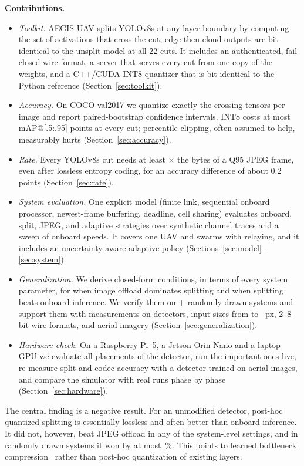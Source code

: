 \documentclass[journal,twocolumn,10pt]{IEEEtran}
\begin{document}
\textbf{Contributions.}
\begin{itemize}
\item \emph{Toolkit.} AEGIS-UAV splits YOLOv8s at any layer boundary by computing the set of activations that cross the cut; edge-then-cloud outputs are bit-identical to the unsplit model at all 22 cuts. It includes an authenticated, fail-closed wire format, a server that serves every cut from one copy of the weights, and a C++/CUDA INT8 quantizer that is bit-identical to the Python reference (Section~\ref{sec:toolkit}).
\item \emph{Accuracy.} On COCO val2017 we quantize exactly the crossing tensors per image and report paired-bootstrap confidence intervals. INT8 costs at most \MaxAbsDeltaINT{} mAP@[.5:.95] points at every cut; percentile clipping, often assumed to help, measurably hurts (Section~\ref{sec:accuracy}).
\item \emph{Rate.} Every YOLOv8s cut needs at least \RatioMinSplitOverJPEGQNinetyFive$\times$ the bytes of a Q95 JPEG frame, even after lossless entropy coding, for an accuracy difference of about 0.2 points (Section~\ref{sec:rate}).
\item \emph{System evaluation.} One explicit model (finite link, sequential onboard processor, newest-frame buffering, deadline, cell sharing) evaluates onboard, split, JPEG, and adaptive strategies over synthetic channel traces and a sweep of onboard speeds. It covers one UAV and swarms with relaying, and it includes an uncertainty-aware adaptive policy (Sections~\ref{sec:model}--\ref{sec:system}).
\item \emph{Generalization.} We derive closed-form conditions, in terms of every system parameter, for when image offload dominates splitting and when splitting beats onboard inference. We verify them on \GenNScenarios{} + \GenNSwarmScenarios{} randomly drawn systems and support them with measurements on \GenNModels{} detectors, input sizes from \GenResSizeSmall{} to \GenResSizeLarge~px, 2--8-bit wire formats, and aerial imagery (Section~\ref{sec:generalization}).
\item \emph{Hardware check.} On a Raspberry Pi~5, a Jetson Orin Nano and a laptop GPU we evaluate all \HwNPlacements{} placements of the detector, run the important ones live, re-measure split and codec accuracy with a detector trained on aerial images, and compare the simulator with real runs phase by phase (Section~\ref{sec:hardware}).
\end{itemize}
The central finding is a negative result. For an unmodified detector, post-hoc quantized splitting is essentially lossless and often better than onboard inference. It did not, however, beat JPEG offload in any of the \NumCells{} system-level settings, and in randomly drawn systems it won by at most \GenMaxSplitGainPct\,\%. This points to learned bottleneck compression~\cite{matsubara2023sc2,shao2020bottlenetpp} rather than post-hoc quantization of existing layers.
\end{document}
